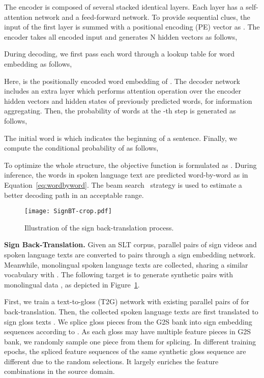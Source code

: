 \documentclass[final]{cvpr}
\begin{document}
The encoder is composed of several stacked identical layers. 
Each layer has a self-attention network and a feed-forward network. 
To provide sequential clues, the input of the first layer is summed with a positional encoding (PE) vector as . 
The encoder takes all encoded input  and generates N hidden vectors as follows, 


During decoding, we first pass each word  through a lookup table for word embedding as follows, 

Here,  is the positionally encoded word embedding of . 
The decoder network includes an extra layer which performs attention operation over the encoder hidden vectors  and hidden states of previously predicted words, for information aggregating. 
Then, the probability of words at the -th step is generated as follows, 

The initial word is  which indicates the beginning of a sentence. 
Finally, we compute the conditional probability of  as follows, 


To optimize the whole structure, the objective function is formulated as . 
During inference, the words in spoken language text are predicted word-by-word as in Equation~\ref{eq:wordbyword}. 
The beam search~\cite{googletranslation} strategy is used to estimate a better decoding path in an acceptable range. 



\begin{figure}[tp]
   \centering
   \texttt{[image: SignBT-crop.pdf]}
   \caption{Illustration of the sign back-translation process. 
   }\label{fig:SignBT}
\vspace{-8pt}
\end{figure}

\textbf{Sign Back-Translation.}
Given an SLT corpus, parallel pairs of sign videos  and spoken language texts  
are converted to  pairs through a sign embedding network. 
Meanwhile, monolingual spoken language texts  are collected, sharing a similar vocabulary with . 
The following target is to generate synthetic pairs  with monolingual data , as depicted in Figure~\ref{fig:SignBT}. 

First, we train a text-to-gloss (T2G) network with existing parallel pairs of  for back-translation. 
Then, the collected spoken language texts  are first translated to sign gloss texts . 
We splice gloss pieces from the G2S bank into sign embedding sequences  according to . 
As each gloss may have multiple feature pieces in G2S bank, we randomly sample one piece from them for splicing. 
In different training epochs, the spliced feature sequences of the same synthetic gloss sequence are different due to the random selections.
It largely enriches the feature combinations in the source domain. 
\end{document}
